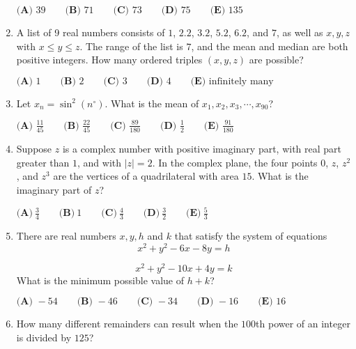 \documentclass{article}
\begin{document}
\begin{enumerate}[label=\arabic*., itemsep=0.5em]
$
\textbf{(A) }39 \qquad
\textbf{(B) }71 \qquad
\textbf{(C) }73 \qquad
\textbf{(D) }75 \qquad
\textbf{(E) }135 \qquad
$\par \vspace{0.5em}\item A list of 9 real numbers consists of $1$, $2.2 $, $3.2 $, $5.2 $, $6.2 $, and $7$, as well as $x, y,z$ with $x\leq y\leq z$. The range of the list is $7$, and the mean and median are both positive integers. How many ordered triples $(x,y,z)$ are possible?

$\textbf{(A) }1 \qquad\textbf{(B) }2 \qquad\textbf{(C) }3 \qquad\textbf{(D) }4 \qquad\textbf{(E) }\text{infinitely many}\qquad$\par \vspace{0.5em}\item Let $x_{n} = \sin^2(n^\circ)$. What is the mean of $x_{1}, x_{2}, x_{3}, \cdots, x_{90}$?

$
\textbf{(A) }\frac{11}{45} \qquad
\textbf{(B) }\frac{22}{45} \qquad
\textbf{(C) }\frac{89}{180} \qquad
\textbf{(D) }\frac{1}{2} \qquad
\textbf{(E) }\frac{91}{180} \qquad
$\par \vspace{0.5em}\item Suppose $z$ is a complex number with positive imaginary part, with real part greater than $1$, and with $|z| = 2$. In the complex plane, the four points $0$, $z$, $z^{2}$, and $z^{3}$ are the vertices of a quadrilateral with area $15$. What is the imaginary part of $z$?

$\textbf{(A)}~\frac{3}{4}\qquad\textbf{(B)}~1\qquad\textbf{(C)}~\frac{4}{3}\qquad\textbf{(D)}~\frac{3}{2}\qquad\textbf{(E)}~\frac{5}{3}$\par \vspace{0.5em}\item There are real numbers $x,y,h$ and $k$ that satisfy the system of equations
\begin{equation*}
x^2 + y^2 - 6x - 8y = h
\end{equation*}

\begin{equation*}
x^2 + y^2 - 10x + 4y = k
\end{equation*}
What is the minimum possible value of $h+k$?

$
\textbf{(A) }-54 \qquad
\textbf{(B) }-46 \qquad
\textbf{(C) }-34 \qquad
\textbf{(D) }-16 \qquad
\textbf{(E) }16 \qquad
$\par \vspace{0.5em}\item How many different remainders can result when the $100$th power of an integer is divided by $125$?


\end{enumerate}
\end{document}
